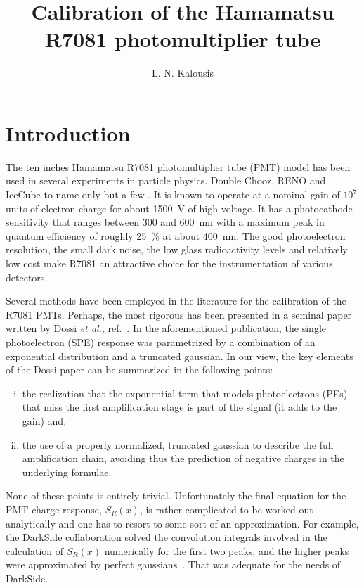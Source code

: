 \documentclass[a4paper,11pt]{article}
\title{\boldmath Calibration of the Hamamatsu R7081 photomultiplier tube}
\author[a]{L. N. Kalousis}
\affiliation[a]{Physics Department, National Technical University, 157 80 Zografou, Athens, Greece}
\begin{document}
\maketitle
\flushbottom

\section{Introduction}
\label{sec:intro}

The ten inches Hamamatsu R7081 photomultiplier tube (PMT) model has been used in several experiments in particle physics. 
Double Chooz, RENO and IceCube to name only but a few \cite{dc,reno,icecube}.
It is known to operate at a nominal gain of $10^7$ units of electron charge for about 1500~V of high voltage. 
It has a photocathode sensitivity that ranges between 300 and 600~nm with a maximum peak in quantum efficiency of roughly 25~$\%$ at about 400~nm. 
The good photoelectron resolution, the small dark noise, the low glass radioactivity levels and relatively low cost make R7081 an attractive choice for the instrumentation of various detectors. 

Several methods have been employed in the literature for the calibration of the R7081 PMTs. 
Perhaps, the most rigorous has been presented in a seminal paper written by Dossi \emph{et al.}, ref.~\cite{dossi}. 
In the aforementioned publication, the single photoelectron (SPE) response was parametrized by a combination of an exponential distribution and a truncated gaussian. 
In our view, the key elements of the Dossi paper can be summarized in the following points:
\begin{enumerate}[i.]
\item the realization that the exponential term that models photoelectrons (PEs) that miss the first amplification stage is part of the signal (it adds to the gain) and,
\item the use of a properly normalized, truncated gaussian to describe the full amplification chain, avoiding thus the prediction of negative charges in the underlying formulae. 
\end{enumerate}
None of these points is entirely trivial. 
Unfortunately the final equation for the PMT charge response, $S_R(x)$, is rather complicated to be worked out analytically and one has to resort to some sort of an approximation. %
For example, the DarkSide collaboration solved the convolution integrals involved in the calculation of $S_R(x)$ numerically for the first two peaks, and the higher peaks were approximated by perfect gaussians~\cite{darkside}. 
That was adequate for the needs of DarkSide. 
\end{document}
